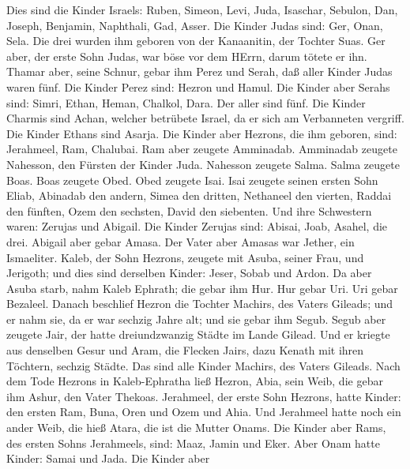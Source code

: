  Dies sind die Kinder Israels: Ruben, Simeon, Levi, Juda,
Isaschar, Sebulon,  Dan, Joseph, Benjamin, Naphthali, Gad,
Asser.  Die Kinder Judas sind: Ger, Onan, Sela. Die drei
wurden ihm geboren von der Kanaanitin, der Tochter Suas. Ger aber, der
erste Sohn Judas, war böse vor dem HErrn, darum tötete er ihn.
 Thamar aber, seine Schnur, gebar ihm Perez und Serah, daß
aller Kinder Judas waren fünf.  Die Kinder Perez sind:
Hezron und Hamul.  Die Kinder aber Serahs sind: Simri,
Ethan, Heman, Chalkol, Dara. Der aller sind fünf.  Die
Kinder Charmis sind Achan, welcher betrübete Israel, da er sich am
Verbanneten vergriff.  Die Kinder Ethans sind Asarja.
 Die Kinder aber Hezrons, die ihm geboren, sind: Jerahmeel,
Ram, Chalubai.  Ram aber zeugete Amminadab. Amminadab
zeugete Nahesson, den Fürsten der Kinder Juda.  Nahesson
zeugete Salma. Salma zeugete Boas.  Boas zeugete Obed. Obed
zeugete Isai.  Isai zeugete seinen ersten Sohn Eliab,
Abinadab den andern, Simea den dritten,  Nethaneel den
vierten, Raddai den fünften,  Ozem den sechsten, David den
siebenten.  Und ihre Schwestern waren: Zerujas und Abigail.
Die Kinder Zerujas sind: Abisai, Joab, Asahel, die drei. 
Abigail aber gebar Amasa. Der Vater aber Amasas war Jether, ein
Ismaeliter.  Kaleb, der Sohn Hezrons, zeugete mit Asuba,
seiner Frau, und Jerigoth; und dies sind derselben Kinder: Jeser, Sobab
und Ardon.  Da aber Asuba starb, nahm Kaleb Ephrath; die
gebar ihm Hur.  Hur gebar Uri. Uri gebar Bezaleel.
 Danach beschlief Hezron die Tochter Machirs, des Vaters
Gileads; und er nahm sie, da er war sechzig Jahre alt; und sie gebar ihm
Segub.  Segub aber zeugete Jair, der hatte dreiundzwanzig
Städte im Lande Gilead.  Und er kriegte aus denselben Gesur
und Aram, die Flecken Jairs, dazu Kenath mit ihren Töchtern, sechzig
Städte. Das sind alle Kinder Machirs, des Vaters Gileads. 
Nach dem Tode Hezrons in Kaleb-Ephratha ließ Hezron, Abia, sein Weib,
die gebar ihm Ashur, den Vater Thekoas.  Jerahmeel, der
erste Sohn Hezrons, hatte Kinder: den ersten Ram, Buna, Oren und Ozem
und Ahia.  Und Jerahmeel hatte noch ein ander Weib, die
hieß Atara, die ist die Mutter Onams.  Die Kinder aber
Rams, des ersten Sohns Jerahmeels, sind: Maaz, Jamin und Eker.
 Aber Onam hatte Kinder: Samai und Jada. Die Kinder aber
